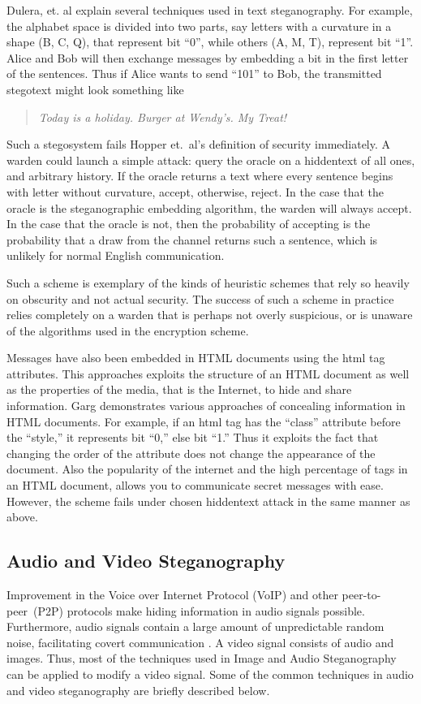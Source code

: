 \documentclass[11pt]{article}
\begin{document}
Dulera, et. al \cite{Dulera} explain several techniques used in text
steganography. For example, the alphabet space is divided into two
parts, say letters with a curvature in a shape (B, C, Q), that
represent bit ``0'', while others (A, M, T), represent bit ``1''. Alice
and Bob will then exchange messages by embedding a bit in the first
letter of the sentences. Thus if Alice wants to send ``101'' to Bob, the
transmitted stegotext might look something like

\begin{quote}
  \itshape Today is a holiday. Burger at Wendy's. My Treat!
\end{quote}

Such a stegosystem fails Hopper et.\ al's definition of security
immediately. A warden could launch a simple attack: query the oracle
on a hiddentext of all ones, and arbitrary history. If the oracle
returns a text where every sentence begins with letter without
curvature, accept, otherwise, reject. In the case that the oracle is
the steganographic embedding algorithm, the warden will always accept.
In the case that the oracle is not, then the probability of accepting
is the probability that a draw from the channel returns such a
sentence, which is unlikely for normal English communication.

Such a scheme is exemplary of the kinds of heuristic schemes that rely
so heavily on obscurity and not actual security. The success of such a
scheme in practice relies completely on a warden that is perhaps not
overly suspicious, or is unaware of the algorithms used in the
encryption scheme.

Messages have also been embedded in HTML documents using the html tag
attributes. This approaches exploits the structure of an HTML document
as well as the properties of the media, that is the Internet, to hide
and share information. Garg \cite{Garg2011} demonstrates various approaches
of concealing information in HTML documents. For example, if an html
tag has the ``class'' attribute before the ``style,'' it represents
bit ``0,'' else bit ``1.'' Thus it exploits the fact that changing the
order of the attribute does not change the appearance of the document.
Also the popularity of the internet and the high percentage of tags in
an HTML document, allows you to communicate secret messages with ease.
However, the scheme fails under chosen hiddentext attack in the same
manner as above.

\subsection{Audio and Video Steganography}
Improvement in the Voice over Internet Protocol (VoIP) and other
peer-to-peer~(P2P) protocols make hiding information in audio signals
possible. Furthermore, audio signals contain a large amount of
unpredictable random noise, facilitating covert communication
\cite{Meghanathan}. A
video signal consists of audio and images. Thus, most of the
techniques used in Image and Audio Steganography can be applied to
modify a video signal. Some of the common techniques in audio and
video steganography are briefly described below.
\end{document}
